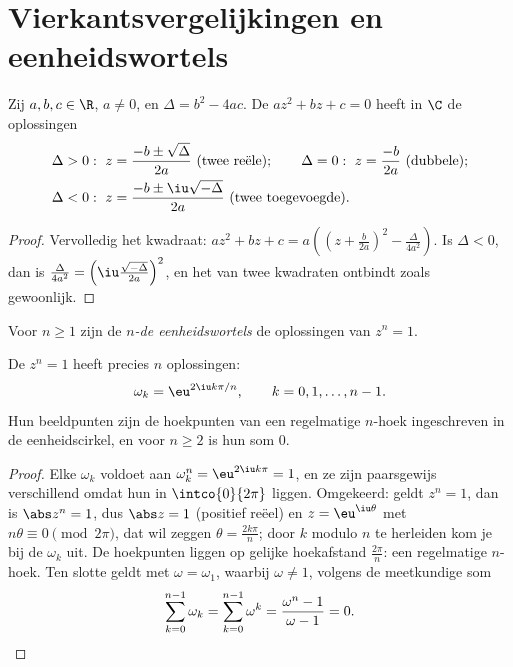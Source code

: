 \section{Vierkantsvergelijkingen en eenheidswortels}

\begin{theorem}\label{thm:g12:complex:quadratic}
Zij $a, b, c \in \R$, $a \neq 0$, en $\Delta = b^2 - 4ac$. De 
$az^2 + bz + c = 0$ heeft in $\C$ de oplossingen
\[
\begin{aligned}
&\Delta > 0:\ z = \frac{-b \pm \sqrt{\Delta}}{2a} \ (\text{twee reële}); \qquad
\Delta = 0:\ z = \frac{-b}{2a} \ (\text{dubbele}); \\
&\Delta < 0:\ z = \frac{-b \pm \iu\sqrt{-\Delta}}{2a} \ (\text{twee
toegevoegde}).
\end{aligned}
\]
\end{theorem}

\begin{proof}
Vervolledig het kwadraat:
$az^2 + bz + c = a\left(\left(z + \frac{b}{2a}\right)^2 -
\frac{\Delta}{4a^2}\right)$. Is $\Delta < 0$, dan is
$\frac{\Delta}{4a^2} = \left(\iu\frac{\sqrt{-\Delta}}{2a}\right)^2$, en het
 van twee kwadraten ontbindt zoals gewoonlijk.
\end{proof}

\begin{definition}[Eenheidswortels]\label{def:g12:complex:rootsofunity}
Voor $n \geq 1$ zijn de \emph{$n$-de eenheidswortels}
de oplossingen van $z^n = 1$.
\end{definition}

\begin{theorem}\label{thm:g12:complex:rootsofunity}
De  $z^n = 1$ heeft precies $n$ oplossingen:
\[
\omega_k = \eu^{2\iu k\pi/n}, \qquad k = 0, 1, \dots, n-1 .
\]
Hun beeldpunten zijn de hoekpunten van een regelmatige $n$-hoek ingeschreven
in de eenheidscirkel, en voor $n \geq 2$ is hun som $0$.
\end{theorem}

\begin{proof}
Elke $\omega_k$ voldoet aan $\omega_k^n = \eu^{2\iu k\pi} = 1$, en ze zijn
paarsgewijs verschillend omdat hun  in $\intco{0}{2\pi}$ liggen.
Omgekeerd: geldt $z^n = 1$, dan is $\abs z^n = 1$, dus $\abs z = 1$ (positief
reëel) en $z = \eu^{\iu\theta}$ met $n\theta \equiv 0 \pmod{2\pi}$, dat wil
zeggen $\theta = \frac{2k\pi}{n}$; door $k$ modulo $n$ te herleiden kom je bij
de $\omega_k$ uit. De hoekpunten liggen op gelijke hoekafstand
$\frac{2\pi}{n}$: een regelmatige $n$-hoek. Ten slotte geldt met
$\omega = \omega_1$, waarbij $\omega \neq 1$, volgens de meetkundige som
\[
\sum_{k=0}^{n-1}\omega_k = \sum_{k=0}^{n-1}\omega^k
= \frac{\omega^n - 1}{\omega - 1} = 0 . \qedhere
\]
\end{proof}

